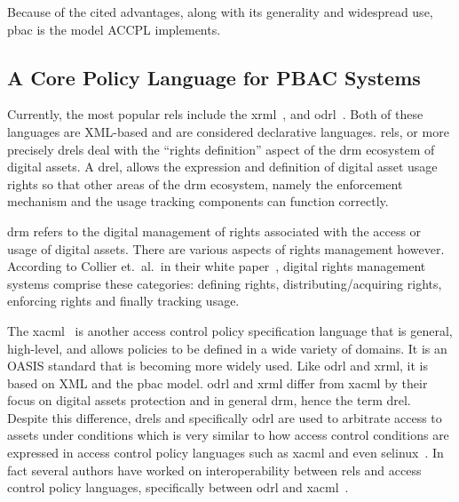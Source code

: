 \documentclass[conference]{IEEEtran}
\begin{document}
Because of the cited advantages, along with its generality and
widespread use, \ac{pbac} is the model \ac{ACCPL} implements.


\subsection{A Core Policy Language for PBAC Systems} 

Currently, the most popular \ac{rel}s include the
\ac{xrml}~\cite{Wang}, and \ac{odrl}~\cite{odrloneone}. Both of these
languages are XML-based and are considered declarative
languages. \ac{rel}s, or more precisely \ac{drel}s deal with the ``rights
definition'' aspect of the \ac{drm} ecosystem of digital assets. 
A \ac{drel}, allows the expression and definition
of digital asset usage rights so that other areas of the \ac{drm}
ecosystem, namely the enforcement mechanism and the usage tracking
components can function correctly.

\ac{drm} refers to the digital management of rights associated with
the access or usage of digital assets. There are various aspects of
rights management however.
According to Collier et.\ al.\ in their white paper~\cite{collier},
%
digital rights management systems comprise these categories: defining
rights, distributing/acquiring rights, enforcing rights and finally
tracking usage.


The \ac{xacml}~\cite{xacml3} is another access control policy
specification language that is general, high-level, and allows
policies to be defined in a wide variety of domains.  It is an OASIS
standard that is becoming more widely used.  Like \ac{odrl} and
\ac{xrml}, it is based on XML and the \ac{pbac} model.  \ac{odrl} and
\ac{xrml} differ from \ac{xacml} by their focus on digital assets
protection and in general \ac{drm}, hence the term \ac{drel}.  Despite
this difference, \ac{drel}s and specifically \ac{odrl} are used to
arbitrate access to assets under conditions which is very similar to
how access control conditions are expressed in access control policy
languages such as \ac{xacml} and even \ac{selinux}~\cite{selinux}. In
fact several authors have worked on interoperability between \ac{rel}s
and access control policy languages, specifically between \ac{odrl}
and
\ac{xacml}~\cite{prados2005interoperability,maronas2009architecture}.
\end{document}
